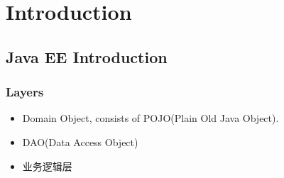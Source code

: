 \documentclass[11pt, a4paper]{book}
\begin{document}
\chapter{Introduction}
\section{Java EE Introduction}
\subsection{Layers}
\begin{itemize}
\item Domain Object, consists of POJO(Plain Old Java Object).
\item DAO(Data Access Object)
\item 业务逻辑层
\end{itemize}
\end{document}
